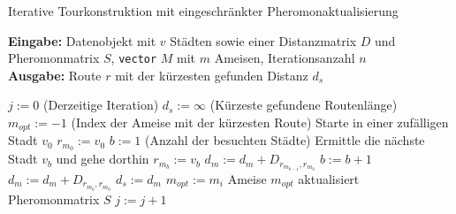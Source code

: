 \documentclass[doktyp=barbeit, sprache=german]{TUBAFarbeiten}
\begin{document}
\begin{algorithm}
\caption{Iterative Tourkonstruktion mit eingeschränkter Pheromonaktualisierung}
\label{MMASIterativeTour}
\textbf{Eingabe:} Datenobjekt mit $v$ Städten sowie einer Distanzmatrix $D$ und Pheromonmatrix $S$, \texttt{vector} $M$ mit $m$ Ameisen, Iterationsanzahl $n$
\\\textbf{Ausgabe:} Route $r$ mit der kürzesten gefunden Distanz $d_s$
\begin{algorithmic}[1]
\State $j := 0$ (Derzeitige Iteration)
\State $d_s := \infty$ (Kürzeste gefundene Routenlänge)
\State $m_{opt} := -1$ (Index der Ameise mit der kürzesten Route)
\State Starte in einer zufälligen Stadt $v_0$
\State $r_{m_0} := v_0$
\State $b := 1$ (Anzahl der besuchten Städte)
\State Ermittle die nächste Stadt $v_b$ und gehe dorthin
\State $r_{m_b} := v_b$
\State $d_m := d_m + D_{r_{m_{b-1}},r_{m_b}}$
\State $b := b + 1$
\EndWhile
\State $d_m := d_m + D_{r_{m_b},r_{m_0}}$
\State $d_s := d_m$
\State $m_{opt} := m_i$
\EndIf
\EndFor
\State Ameise $m_{opt}$ aktualisiert Pheromonmatrix $S$
\State $j := j + 1$
\EndWhile
\end{algorithmic}
\end{algorithm}
\end{document}
